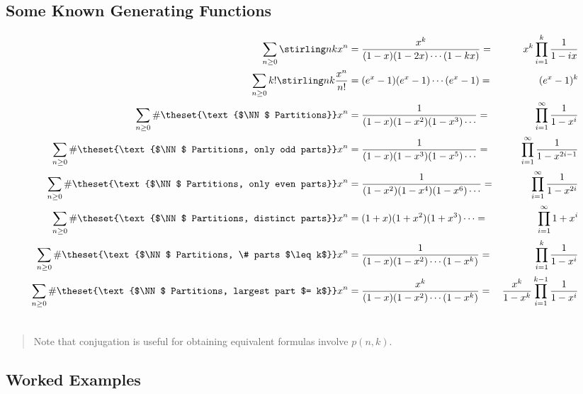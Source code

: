 \hypertarget{some-known-generating-functions}{%
\subsection{Some Known Generating
Functions}\label{some-known-generating-functions}}

\begin{align*}\begin{aligned}
\sum_{n\geq 0} \stirling n k x^n &= \frac{x^k}{(1-x)(1-2x)\cdots(1-kx)} =& x^k\prod_{i=1}^k \frac 1 {1-ix} \\
\sum_{n\geq 0} k! \stirling n k \frac{x^n}{n!} &= (e^x-1)(e^x-1)\cdots(e^x-1) =& (e^x-1)^k \\
\sum_{n\geq 0} \#\theset{\text{$\NN$ Partitions}} x^n &= \frac{1}{(1-x)(1-x^2)(1-x^3)\cdots} =& \prod_{i=1}^\infty \frac 1 {1-x^i} \\
\sum_{n\geq 0} \#\theset{\text{$\NN$ Partitions, only odd parts}} x^n &= \frac{1}{(1-x)(1-x^3)(1-x^5)\cdots} =& \prod_{i=1}^\infty \frac{1}{1-x^{2i-1}} \\
\sum_{n\geq 0} \#\theset{\text{$\NN$ Partitions, only even parts}} x^n &= \frac{1}{(1-x^2)(1-x^4)(1-x^6)\cdots} =& \prod_{i=1}^\infty \frac{1}{1-x^{2i}} \\
\sum_{n\geq 0} \#\theset{\text{$\NN$ Partitions, distinct parts}} x^n &= {(1+x)(1+x^2)(1+x^3)\cdots} =& \prod_{i=1}^{\infty} {1+x^i} \\
\sum_{n\geq 0} \#\theset{\text{$\NN$ Partitions, \# parts $\leq k$}} x^n &= \frac{1}{(1-x)(1-x^2)\cdots(1-x^k)} =& \prod_{i=1}^{k} \frac 1 {1-x^i}  &\\
\sum_{n\geq 0} \#\theset{\text{$\NN$ Partitions, largest part $= k$}} x^n &= \frac{x^k}{(1-x)(1-x^2)\cdots(1-x^k)} =& \frac{x^k}{1-x^k}\prod_{i=1}^{k-1} \frac 1 {1-x^i} \\
\
\end{aligned} 
\end{align*}

\begin{quote}
Note that conjugation is useful for obtaining equivalent formulas
involve \(p(n, k)\).
\end{quote}

\hypertarget{worked-examples}{%
\subsection{Worked Examples}\label{worked-examples}}

